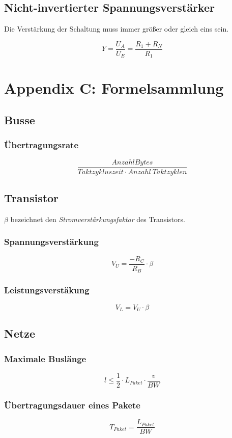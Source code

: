 \subsection{Nicht-invertierter Spannungsverstärker}
Die Verstärkung der Schaltung muss immer größer oder gleich eins sein.

\[Y = \frac{U_A}{U_E} = \frac{R_1 + R_N}{R_1}\]



\section{Appendix C: Formelsammlung}

\subsection{Busse}

\subsubsection{Übertragungsrate}
\[\frac{AnzahlBytes}{Taktzykluszeit \cdot Anzahl~Taktzyklen}\]


\subsection{Transistor}
$\beta$ bezeichnet den \textit{Stromverstärkungsfaktor} des Transistors.

\subsubsection{Spannungsverstärkung}
\[V_U = \frac{-R_C}{R_B} \cdot \beta\]

\subsubsection{Leistungsverstäkung}
\[V_L = V_U \cdot \beta\]


\subsection{Netze}

\subsubsection{Maximale Buslänge}
\[l \le \frac{1}{2} \cdot L_{Paket} \cdot \frac{v}{BW}\]

\subsubsection{Übertragungsdauer eines Pakete}
\[T_{Paket} = \frac{L_{Paket}}{BW}\]


